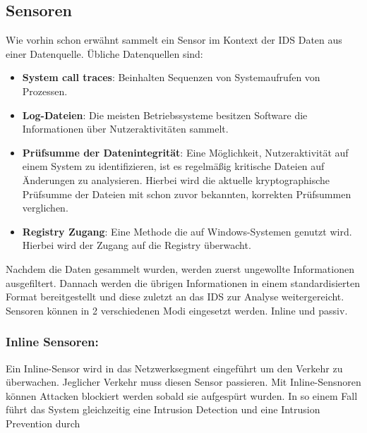 \subsection{Sensoren}

Wie vorhin schon erwähnt sammelt ein Sensor im Kontext der IDS Daten aus einer Datenquelle. Übliche Datenquellen sind: \cite{IDS_Book_2}

\begin{itemize}
    \item \textbf{System call traces}: Beinhalten Sequenzen von Systemaufrufen von Prozessen. \cite{IDS_Book_2}\bigbreak
    \item \textbf{Log-Dateien}: Die meisten Betriebssysteme besitzen Software die Informationen über Nutzeraktivitäten sammelt.\cite{IDS_Book_2}\bigbreak
    \item \textbf{Prüfsumme der Datenintegrität}: Eine Möglichkeit, Nutzeraktivität auf einem System zu identifizieren, ist es regelmäßig kritische Dateien auf Änderungen zu analysieren. Hierbei wird die aktuelle kryptographische Prüfsumme der Dateien mit schon zuvor bekannten, korrekten Prüfsummen verglichen.\cite{IDS_Book_2}\bigbreak
    \item \textbf{Registry Zugang}: Eine Methode die auf Windows-Systemen genutzt wird. Hierbei wird der Zugang auf die Registry überwacht.\cite{IDS_Book_2}\bigbreak
\end{itemize}
Nachdem die Daten gesammelt wurden, werden zuerst ungewollte Informationen ausgefiltert. Dannach werden die übrigen Informationen in einem standardisierten Format bereitgestellt und diese zuletzt an das IDS zur Analyse weitergereicht.\cite{IDS_Book_2}
Sensoren können in 2 verschiedenen Modi eingesetzt werden. Inline und passiv.\cite{IDS_Book_2}

\subsubsection{Inline Sensoren:}
Ein Inline-Sensor wird in das Netzwerksegment eingeführt um den Verkehr zu überwachen. Jeglicher Verkehr muss diesen Sensor passieren. Mit Inline-Sensnoren können Attacken blockiert werden sobald sie aufgespürt wurden. In so einem Fall führt das System gleichzeitig eine Intrusion Detection und eine Intrusion Prevention durch\cite{url_sensors}\cite{IDS_Book_2}

